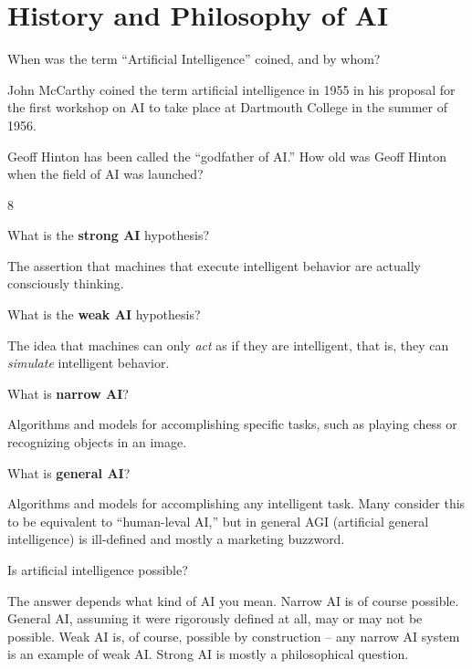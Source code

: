 \newpage

\section{History and Philosophy of AI}

\begin{questions}

\question When was the term ``Artificial Intelligence'' coined, and by whom?

\begin{solution}[1in]
John McCarthy coined the term artificial intelligence in 1955 in his proposal for the first workshop on AI to take place at Dartmouth College in the summer of 1956.
\end{solution}

\question Geoff Hinton has been called the ``godfather of AI.''  How old was Geoff Hinton when the field of AI was launched?

\begin{solution}[1in]
8
\end{solution}

\question What is the {\bf strong AI} hypothesis?

\begin{solution}[1in]
The assertion that machines that execute intelligent behavior are actually consciously thinking.
\end{solution}

\question What is the {\bf weak AI} hypothesis?

\begin{solution}[1in]
The idea that machines can only {\it act} as if they are intelligent, that is, they can {\it simulate} intelligent behavior.
\end{solution}

\question What is {\bf narrow AI}?

\begin{solution}[1in]
Algorithms and models for accomplishing specific tasks, such as playing chess or recognizing objects in an image.
\end{solution}

\question What is {\bf general AI}?

\begin{solution}[1in]
Algorithms and models for accomplishing any intelligent task.  Many consider this to be equivalent to ``human-leval AI,'' but in general AGI (artificial general intelligence) is ill-defined and mostly a marketing buzzword.
\end{solution}

\newpage

\question Is artificial intelligence possible?

\begin{solution}[2in]
The answer depends what kind of AI you mean.  Narrow AI is of course possible.  General AI, assuming it were rigorously defined at all, may or may not be possible.  Weak AI is, of course, possible by construction -- any narrow AI system is an example of weak AI.  Strong AI is mostly a philosophical question.
\end{solution}


\end{questions}



